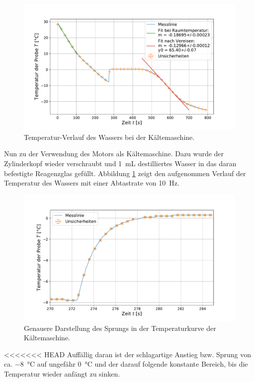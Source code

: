 	\begin{figure}[ht]
		\centering
		\includegraphics[width=\textwidth]{data/kalt_machen.pdf}
		\caption{Temperatur-Verlauf des Wassers bei der Kältemaschine.}
		\label{fig:Kältemaschine}	
	\end{figure}
	Nun zu der Verwendung des Motors als Kältemaschine.
	Dazu wurde der Zylinderkopf wieder verschraubt und \SI{1}{\milli\liter} destilliertes Wasser in das daran befestigte Reagenzglas gefüllt.
	Abbildung \ref{fig:Kältemaschine} zeigt den aufgenommen Verlauf der Temperatur des Wassers mit einer Abtastrate von \SI{10}{\hertz}.
	\begin{figure}[ht]
		\centering
		\includegraphics[width=\textwidth]{data/kalt_sprung.pdf}
		\caption{Genauere Darstellung des Sprungs in der Temperaturkurve der Kältemaschine.}
		\label{fig:KaltSprung}	
	\end{figure} 
<<<<<<< HEAD
	Auffällig daran ist der schlagartige Anstieg bzw. Sprung von ca. \SI{-8}{\celsius} auf ungefähr \SI{0}{\celsius} und der darauf folgende konstante Bereich, bis die Temperatur wieder anfängt zu sinken.
